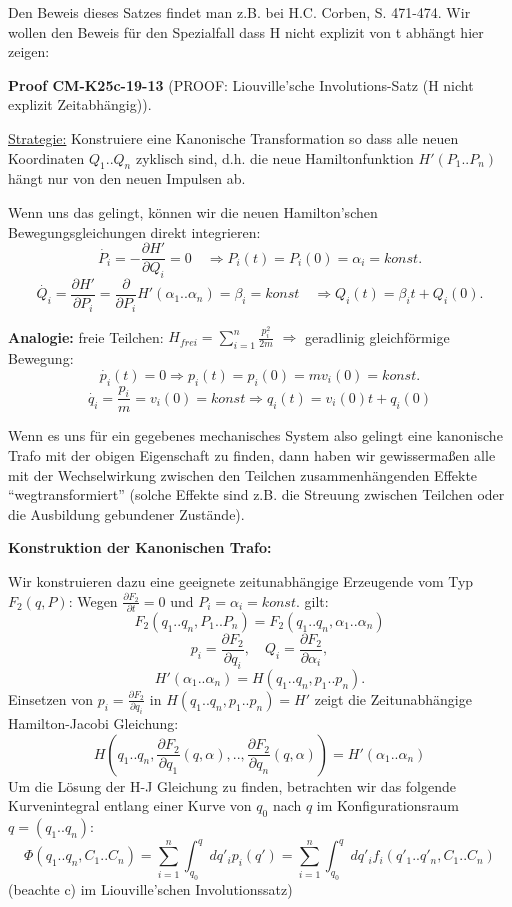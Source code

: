 \documentclass[10pt, letterpaper]{article}
\newcommand{\CustomHeading}[3]{%
  \par\medskip\noindent%
  \textbf{#1 #2} \textnormal{(#3)}.\enskip%
}
\newenvironment{PROOF}[2]{\begin{unitbox}\CustomHeading{Proof}{#1}{#2}}{\end{unitbox}}
\begin{document}
Den Beweis dieses Satzes findet man z.B. bei H.C. Corben, S. 471-474.
Wir wollen den Beweis für den Spezialfall dass H nicht explizit von t abhängt hier zeigen:


\begin{PROOF}{CM-K25c-19-13}{PROOF: Liouville'sche Involutions-Satz (H nicht explizit Zeitabhängig)}
\underline{Strategie:} Konstruiere eine Kanonische Transformation so dass alle neuen Koordinaten $Q_1..Q_n$ zyklisch sind, d.h. die neue Hamiltonfunktion $H'(P_1..P_n)$ hängt nur von den neuen Impulsen ab.

Wenn uns das gelingt, können wir die neuen Hamilton'schen Bewegungsgleichungen direkt integrieren:
\[
\dot{P_i} = -\frac{\partial H'}{\partial Q_i} = 0 \quad \Rightarrow P_i(t) = P_i(0) = \alpha_i = konst.
\]
\[
\dot{Q_i} = \frac{\partial H'}{\partial P_i} = \frac{\partial}{\partial P_i}H'(\alpha_1..\alpha_n) = \beta_i = konst \quad \Rightarrow Q_i(t) = \beta_it + Q_i(0).
\]


\textbf{Analogie:} freie Teilchen: $H_{frei} = \sum_{i=1}^n \frac{p_i^2}{2m}$
$\Rightarrow$ geradlinig gleichförmige Bewegung:
\[
\dot{p_i}(t) = 0 \Rightarrow p_i(t) = p_i(0) = mv_i(0) = konst.
\]
\[
\dot{q_i} = \frac{p_i}{m} = v_i(0) = konst \Rightarrow q_i(t) = v_i(0)t + q_i(0)
\]

Wenn es uns für ein gegebenes mechanisches System also gelingt eine kanonische Trafo mit der obigen Eigenschaft zu finden, dann haben wir gewissermaßen alle mit der Wechselwirkung zwischen den Teilchen zusammenhängenden Effekte ``wegtransformiert'' (solche Effekte sind z.B. die Streuung zwischen Teilchen oder die Ausbildung gebundener Zustände).


\textbf{Konstruktion der Kanonischen Trafo:}

Wir konstruieren dazu eine geeignete zeitunabhängige Erzeugende vom Typ $F_2(q,P)$: Wegen $\frac{\partial F_2}{\partial t} = 0$ und $P_i = \alpha_i = konst.$ gilt:
\[
F_2(q_1..q_n,P_1..P_n) = F_2(q_1..q_n,\alpha_1..\alpha_n)
\]
\[
p_i = \frac{\partial F_2}{\partial q_i}, \quad Q_i = \frac{\partial F_2}{\partial \alpha_i},
\]
\[
H'(\alpha_1..\alpha_n) = H(q_1..q_n,p_1..p_n).
\]
Einsetzen von $p_i = \frac{\partial F_2}{\partial q_i}$ in $H(q_1..q_n,p_1..p_n) = H'$ zeigt die Zeitunabhängige Hamilton-Jacobi Gleichung: 
\[
H(q_1..q_n, \frac{\partial F_2}{\partial q_1}(q,\alpha),..,\frac{\partial F_2}{\partial q_n}(q,\alpha)) = H'(\alpha_1..\alpha_n)
\]
\noindent
Um die Lösung der H-J Gleichung zu finden, betrachten wir das folgende Kurvenintegral entlang einer Kurve von $q_0$ nach $q$ im Konfigurationsraum $q=(q_1..q_n)$:
\[
\Phi(q_1..q_n,C_1..C_n) = \sum_{i=1}^n \int_{q_0}^q dq'_i p_i(q') = \sum_{i=1}^n \int_{q_0}^q dq'_i f_i(q'_1..q'_n,C_1..C_n)
\]
(beachte c) im Liouville'schen Involutionssatz)


\end{PROOF}
\end{document}
